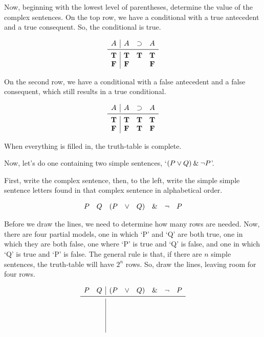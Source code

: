\documentclass[../logic-text.tex]{subfiles}
\begin{document}
Now, beginning with the lowest level of parentheses, determine the value of the complex sentences.
On the top row, we have a conditional with a true antecedent and a true consequent.
So, the conditional is true.

\[
  \begin{array}{c|ccc}
    A & A & \lif & A \\ \midrule
    \true & \true & \true & \true\\
    \false & \false & & \false\\
  \end{array}
\]

On the second row, we have a conditional with a false antecedent and a false consequent, which still results in a true conditional.

\[
  \begin{array}{c|ccc}
    A & A & \lif & A \\ \midrule
    \true & \true & \true & \true\\
    \false & \false & \true & \false\\
  \end{array}
\]


When everything is filled in, the truth-table is complete.

Now, let's do one containing two simple sentences, \enquote*{\((P \lor Q) \mathbin{\&} \neg P\)}.

First, write the complex sentence, then, to the left, write the simple simple sentence letters found in that complex sentence in alphabetical order.

\[
  \begin{array}{cccccccc}
    P & Q & (P & \lor & Q) & \mathbin{\&} & \neg & P

\end{array}
\]


Before we draw the lines, we need to determine how many rows are needed.
Now, there are four partial models, one in which \enquote*{P} and \enquote*{Q} are both true, one in which they are both false, one where \enquote*{P} is true and \enquote*{Q} is false, and one in which  \enquote*{Q} is true and \enquote*{P} is false.
The general rule is that, if there are \(n\) simple sentences, the truth-table will have \(2^{n}\) rows.
So, draw the lines, leaving room for four rows.

\[
  \begin{array}{cc|cccccc}
    P & Q & (P & \lor & Q) & \land & \lneg & P \\ \midrule
    \phantom{x}&&&&&&&\\
    \phantom{x}&&&&&&&\\
    \phantom{x}&&&&&&&\\
    \phantom{x}&&&&&&&\\
\end{array}
\]
\end{document}
